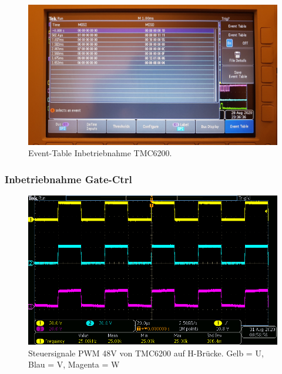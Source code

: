 \begin{appendix}
\begin{figure}[h!]
\center
\includegraphics[width = \textwidth]{graphics/TMC6200_EventTable_Lesen_Bild}
\caption{Event-Table Inbetriebnahme TMC6200.}
\label{fig:TMC6200_EventTable_Lesen_Bild}
\end{figure}

\newpage

\subsubsection{Inbetriebnahme Gate-Ctrl}\label{Appendix:TMC6200_Gate_Ctrl}

\begin{figure}[h!]
\center
\includegraphics[width = \textwidth]{graphics/TMC6200_Gate_Signal_H}
\caption{Steuersignale PWM 48V von TMC6200 auf H-Brücke. Gelb = U, Blau = V, Magenta = W}
\label{fig:TMC6200_Gate_Signal_H}
\end{figure}


\end{appendix}
